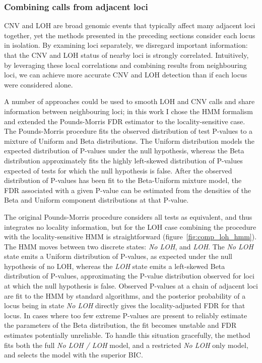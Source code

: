 \documentclass[thesis.tex]{subfiles}
\begin{document}
\subsubsection{Combining calls from adjacent loci}

\Gls{CNV} and \gls{LOH} are broad genomic events that typically affect many adjacent loci together, yet the methods presented in the preceding sections consider each locus in isolation.  By examining loci separately, we disregard important information: that the \gls{CNV} and \gls{LOH} status of nearby loci is strongly correlated.  Intuitively, by leveraging these local correlations and combining results from neighbouring loci, we can achieve more accurate \gls{CNV} and \gls{LOH} detection than if each locus were considered alone.

A number of approaches could be used to smooth LOH and CNV calls and share information between neighbouring loci; in this work I chose the \gls{HMM} formalism and extended the Pounds-Morris FDR estimator\cite{Pounds2003} to the locality-sensitive case.  The Pounds-Morris procedure fits the observed distribution of test P-values to a mixture of Uniform and Beta distributions.  The Uniform distribution models the expected distribution of P-values under the null hypothesis, whereas the Beta distribution approximately fits the highly left-skewed distribution of P-values expected of tests for which the null hypothesis is false.  After the observed distribution of P-values has been fit to the Beta-Uniform mixture model, the \gls{FDR} associated with a given P-value can be estimated from the densities of the Beta and Uniform component distributions at that P-value.

The original Pounds-Morris procedure considers all tests as equivalent, and thus integrates no locality information, but for the \gls{LOH} case combining the procedure with the locality-sensitive \gls{HMM} is straightforward (figure~\ref{fig:comp_loh_hmm}).  The \gls{HMM} moves between two discrete states: \emph{No LOH}, and \emph{LOH}.  The \emph{No LOH} state emits a Uniform distribution of P-values, as expected under the null hypothesis of no \gls{LOH}, whereas the \emph{LOH} state emits a left-skewed Beta distribution of P-values, approximating the P-value distribution observed for loci at which the null hypothesis is false.  Observed P-values at a chain of adjacent loci are fit to the \gls{HMM} by standard algorithms, and the posterior probability of a locus being in state \emph{No LOH} directly gives the locality-adjusted \gls{FDR} for that locus.  In cases where too few extreme P-values are present to reliably estimate the parameters of the Beta distribution, the fit becomes unstable and \gls{FDR} estimates potentially unreliable.  To handle this situation gracefully, the method fits both the full \emph{No LOH / LOH} model, and a restricted \emph{No LOH} only model, and selects the model with the superior \gls{BIC}.
\end{document}
